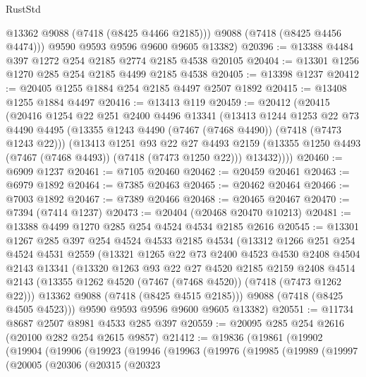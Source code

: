 \begin{lexlean}{RustStd}
\begin{coremodule}
          @13362
          @9088
          (@7418 (@8425 @4466 @2185)))
        @9088
        (@7418 (@8425 @4456 @4474)))
      @9590
      @9593
      @9596
      @9600
      @9605
      @13382)
@20396 := @13388 @4484 @397 @1272 @254 @2185 @2774 @2185 @4538 @20105
@20404 := @13301 @1256 @1270 @285 @254 @2185 @4499 @2185 @4538
@20405 := @13398 @1237
@20412 := @20405 @1255 @1884 @254 @2185 @4497 @2507 @1892
@20415 := @13408 @1255 @1884 @4497
@20416 := @13413 @119
@20459 := @20412
    (@20415
      (@20416
        @1254
        @22
        @251
        @2400
        @4496
        @13341
        (@13413
          @1244
          @1253
          @22
          @73
          @4490
          @4495
          (@13355 @1243 @4490 (@7467 (@7468 @4490)) (@7418 (@7473 @1243 @22)))
          (@13413
            @1251
            @93
            @22
            @27
            @4493
            @2159
            (@13355 @1250 @4493 (@7467 (@7468 @4493)) (@7418 (@7473 @1250 @22)))
            @13432))))
@20460 := @6909 @1237
@20461 := @7105 @20460
@20462 := @20459 @20461
@20463 := @6979 @1892
@20464 := @7385 @20463
@20465 := @20462 @20464
@20466 := @7003 @1892
@20467 := @7389 @20466
@20468 := @20465 @20467
@20470 := @7394 (@7414 @1237)
@20473 := @20404 (@20468 @20470 @10213)
@20481 := @13388 @4499 @1270 @285 @254 @4524 @4534 @2185 @2616
@20545 := @13301
    @1267
    @285
    @397
    @254
    @4524
    @4533
    @2185
    @4534
    (@13312
      @1266
      @251
      @254
      @4524
      @4531
      @2559
      (@13321
        @1265
        @22
        @73
        @2400
        @4523
        @4530
        @2408
        @4504
        @2143
        @13341
        (@13320
          @1263
          @93
          @22
          @27
          @4520
          @2185
          @2159
          @2408
          @4514
          @2143
          (@13355 @1262 @4520 (@7467 (@7468 @4520)) (@7418 (@7473 @1262 @22)))
          @13362
          @9088
          (@7418 (@8425 @4515 @2185)))
        @9088
        (@7418 (@8425 @4505 @4523)))
      @9590
      @9593
      @9596
      @9600
      @9605
      @13382)
@20551 := @11734 @8687 @2507 @8981 @4533 @285 @397
@20559 := @20095 @285 @254 @2616 (@20100 @282 @254 @2615 @9857)
@21412 := @19836
    (@19861
      (@19902
        (@19904
          (@19906
            (@19923
              (@19946
                (@19963
                  (@19976
                    (@19985
                      (@19989
                        (@19997
                          (@20005
                            (@20306
                              (@20315
                                (@20323

\end{coremodule}
\end{lexlean}

